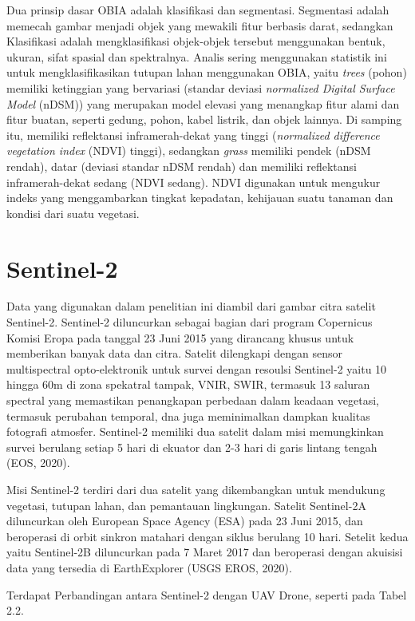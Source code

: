 Dua prinsip dasar OBIA adalah klasifikasi dan segmentasi. Segmentasi adalah memecah gambar menjadi objek yang mewakili fitur berbasis darat, sedangkan Klasifikasi adalah mengklasifikasi objek-objek tersebut menggunakan bentuk, ukuran, sifat spasial dan spektralnya. Analis sering menggunakan statistik ini untuk mengklasifikasikan tutupan lahan menggunakan OBIA, yaitu \textit{trees} (pohon) memiliki ketinggian yang bervariasi (standar deviasi \textit{normalized Digital Surface Model} (nDSM)) yang merupakan model elevasi yang menangkap fitur alami dan fitur buatan, seperti gedung, pohon, kabel listrik, dan objek lainnya. Di samping itu, memiliki reflektansi inframerah-dekat yang tinggi (\textit{normalized difference vegetation index} (NDVI) tinggi), sedangkan \textit{grass} memiliki pendek (nDSM rendah), datar (deviasi standar nDSM rendah) dan memiliki reflektansi inframerah-dekat sedang (NDVI sedang). NDVI digunakan untuk mengukur indeks yang menggambarkan tingkat kepadatan, kehijauan suatu tanaman dan kondisi dari suatu vegetasi.

\section{Sentinel-2}
\hspace{1,2cm}Data yang digunakan dalam penelitian ini diambil dari gambar citra satelit Sentinel-2. Sentinel-2 diluncurkan sebagai bagian dari program Copernicus Komisi Eropa pada tanggal 23 Juni 2015 yang dirancang khusus untuk memberikan banyak data dan citra. Satelit dilengkapi dengan sensor multispectral opto-elektronik untuk survei dengan resoulsi Sentinel-2 yaitu 10 hingga 60m di zona spekatral tampak, VNIR, SWIR, termasuk 13 saluran spectral yang memastikan penangkapan perbedaan dalam keadaan vegetasi, termasuk perubahan temporal, dna juga meminimalkan dampkan kualitas fotografi atmosfer. Sentinel-2 memiliki dua satelit dalam misi memungkinkan survei berulang setiap 5 hari di ekuator dan 2-3 hari di garis lintang tengah (EOS, 2020). 

Misi Sentinel-2 terdiri dari dua satelit yang dikembangkan untuk mendukung vegetasi, tutupan lahan, dan pemantauan lingkungan. Satelit Sentinel-2A diluncurkan oleh European Space Agency (ESA) pada 23 Juni 2015, dan beroperasi di orbit sinkron matahari dengan siklus berulang 10 hari. Setelit kedua yaitu Sentinel-2B diluncurkan pada 7 Maret 2017 dan beroperasi dengan akuisisi data yang tersedia di EarthExplorer (USGS EROS, 2020). 

Terdapat Perbandingan antara Sentinel-2 dengan UAV Drone, seperti pada Tabel 2.2.

